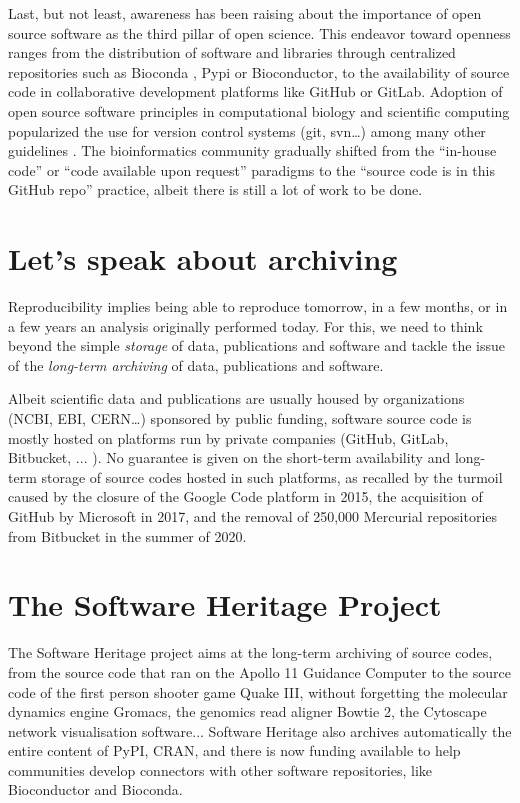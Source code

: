 \documentclass[long, final]{jobim}
\begin{document}
Last, but not least, awareness has been raising about the importance of open source software as the third pillar of open science. This endeavor toward openness ranges from the distribution of software and libraries through centralized repositories such as Bioconda \cite{gruning2018a}, Pypi or Bioconductor, to the availability of source code in collaborative development platforms like GitHub or GitLab. Adoption of open source software principles in computational biology and scientific computing popularized the use for version control systems (git, svn\ldots) among many other guidelines \cite{wilson2014,taschuk2017,jimenez2017}. The bioinformatics community gradually shifted from the “in-house code” or “code available upon request” paradigms to the “source code is in this GitHub repo” practice, albeit there is still a lot of work to be done\cite{cadwallader2021}.


\section{Let’s speak about archiving}
\label{sec:archiving}

Reproducibility implies being able to reproduce tomorrow, in a few months, or in a few years an analysis originally performed today.  For this, we need to think beyond the simple \textit{storage} of data, publications and software and tackle the issue of the \textit{long-term archiving} of data, publications and software. 

Albeit scientific data and publications are usually housed by organizations (NCBI, EBI, CERN…) sponsored by public funding, software source code is mostly hosted on platforms run by private companies (GitHub, GitLab, Bitbucket, ... ). No guarantee is given on the short-term availability and long-term storage of source codes hosted in such platforms, as recalled by the turmoil caused by the closure of the Google Code platform in 2015, the acquisition of GitHub by Microsoft in 2017, and the removal of 250,000 Mercurial repositories from Bitbucket in the summer of 2020.



\section{The Software Heritage Project}
\label{sec:SWH}

The Software Heritage project\cite{dicosmo2017} aims at the long-term archiving of source codes, from the source code that ran on 
the Apollo 11 Guidance Computer\cite{Apollo11AGCsourcecode,TurnLEMaround}
to the source code of the first person shooter game Quake III\cite{QuakeIIIArena,rsqrt}, 
without forgetting the molecular dynamics engine Gromacs\cite{Gromacs,Gromacsv2021.1}, 
the genomics read aligner Bowtie 2\cite{Bowtie2,Bowtie2v242}, 
the Cytoscape\cite{Cytoscape} network visualisation software... 
Software Heritage also archives automatically the entire content of PyPI, CRAN, and there is now funding available to help communities develop connectors with other software repositories, like Bioconductor and Bioconda.
\end{document}
